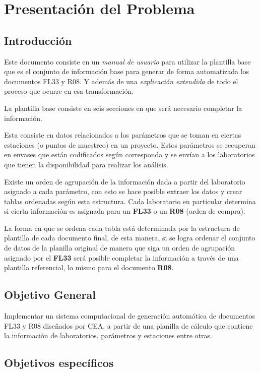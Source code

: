 \chapter{Presentación del Problema}

\section*{Introducción}

Este documento consiste en un \textit{manual de usuario} para utilizar la plantilla base que es el conjunto de información base para generar de forma automatizada los documentos FL33 y R08. Y además de una \textit{explicación extendida} de todo el proceso que ocurre en esa transformación.

La plantilla base consiste en seis secciones en que será necesario completar la información.

Esta consiste en datos relacionados a los parámetros que se toman en ciertas estaciones (o puntos de muestreo) en un proyecto. Estos parámetros se recuperan en envases que están codificados según corresponda y se envían a los laboratorios que tienen la disponibilidad para realizar los análisis.

Existe un orden de agrupación de la información dada a partir del laboratorio asignado a cada parámetro, con esto se hace posible extraer los datos y crear tablas ordenadas según esta estructura. Cada laboratorio en particular determina si cierta información es asignada para un \textbf{FL33} o un \textbf{R08} (orden de compra).

La forma en que se ordena cada tabla está determinada por la estructura de plantilla de cada documento final, de esta manera, si se logra ordenar el conjunto de datos de la planilla original de manera que siga un orden de agrupación asignado por el \textbf{FL33} será posible completar la información a través de una plantilla referencial, lo mismo para el documento \textbf{R08}.

\section*{Objetivo General}

Implementar un sistema computacional de generación automática de documentos FL33 y R08 diseñados por CEA, a partir de una planilla de cálculo que contiene la información de laboratorios, parámetros y estaciones entre otras.

\section*{Objetivos específicos}

